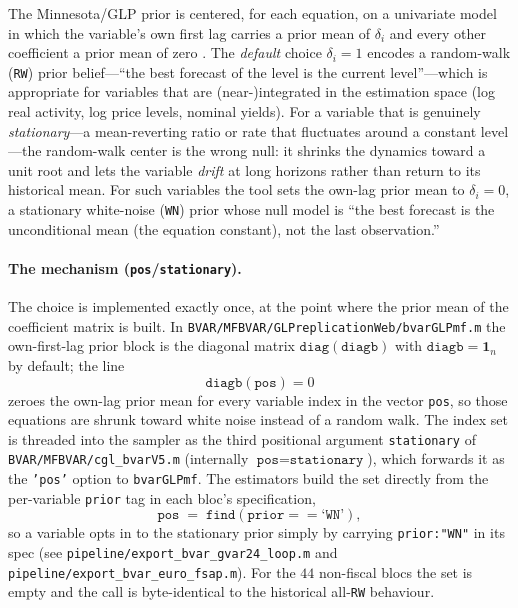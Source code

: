 \documentclass[11pt]{article}
\theoremstyle{definition}
\theoremstyle{remark}
\begin{document}
The Minnesota/GLP prior is centered, for each equation, on a univariate
model in which the variable's own first lag carries a prior mean of
$\delta_i$ and every other coefficient a prior mean of zero
\citep{Litterman1986,DoanLittermanSims1984,Giannone2015}. The
\emph{default} choice $\delta_i=1$ encodes a random-walk (\texttt{RW})
prior belief---``the best forecast of the level is the current level''---which
is appropriate for variables that are (near-)integrated in the
estimation space (log real activity, log price levels, nominal yields).
For a variable that is genuinely \emph{stationary}---a mean-reverting
ratio or rate that fluctuates around a constant level---the random-walk
center is the wrong null: it shrinks the dynamics toward a unit root and
lets the variable \emph{drift} at long horizons rather than return to its
historical mean. For such variables the tool sets the own-lag prior mean
to $\delta_i=0$, a stationary white-noise (\texttt{WN}) prior whose null
model is ``the best forecast is the unconditional mean (the equation
constant), not the last observation.''

\paragraph{The mechanism (\texttt{pos}/\texttt{stationary}).} The choice
is implemented exactly once, at the point where the prior mean of the
coefficient matrix is built. In
\texttt{BVAR/MFBVAR/GLPreplicationWeb/bvarGLPmf.m} the own-first-lag
prior block is the diagonal matrix \(\texttt{diag}(\texttt{diagb})\) with
\(\texttt{diagb}=\mathbf{1}_n\) by default; the line
\[
  \texttt{diagb}(\texttt{pos}) = 0
\]
zeroes the own-lag prior mean for every variable index in the vector
\texttt{pos}, so those equations are shrunk toward white noise instead of
a random walk. The index set is threaded into the sampler as the third
positional argument \texttt{stationary} of
\texttt{BVAR/MFBVAR/cgl\_bvarV5.m} (internally \(\texttt{pos} =
\texttt{stationary}\)), which forwards it as the \texttt{'pos'} option to
\texttt{bvarGLPmf}. The estimators build the set directly from the
per-variable \texttt{prior} tag in each bloc's specification,
\[
  \texttt{pos} \;=\; \texttt{find}(\texttt{prior}==\text{`}\texttt{WN}\text{'}),
\]
so a variable opts in to the stationary prior simply by carrying
\texttt{prior:"WN"} in its spec (see
\texttt{pipeline/export\_bvar\_gvar24\_loop.m} and
\texttt{pipeline/export\_bvar\_euro\_fsap.m}). For the $44$ non-fiscal
blocs the set is empty and the call is byte-identical to the historical
all-\texttt{RW} behaviour.
\end{document}
